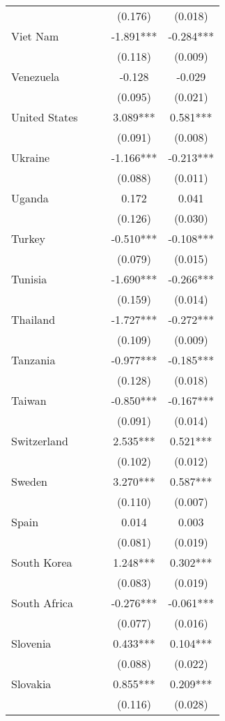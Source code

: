 \documentclass[]{article}
\begin{document}
\begin{tabular}{lcccc}
 &  &  & (0.176) & (0.018) \\
Viet Nam &  &  & -1.891*** & -0.284*** \\
 &  &  & (0.118) & (0.009) \\
Venezuela &  &  & -0.128 & -0.029 \\
 &  &  & (0.095) & (0.021) \\
United States &  &  & 3.089*** & 0.581*** \\
 &  &  & (0.091) & (0.008) \\
Ukraine &  &  & -1.166*** & -0.213*** \\
 &  &  & (0.088) & (0.011) \\
Uganda &  &  & 0.172 & 0.041 \\
 &  &  & (0.126) & (0.030) \\
Turkey &  &  & -0.510*** & -0.108*** \\
 &  &  & (0.079) & (0.015) \\
Tunisia &  &  & -1.690*** & -0.266*** \\
 &  &  & (0.159) & (0.014) \\
Thailand &  &  & -1.727*** & -0.272*** \\
 &  &  & (0.109) & (0.009) \\
Tanzania &  &  & -0.977*** & -0.185*** \\
 &  &  & (0.128) & (0.018) \\
Taiwan &  &  & -0.850*** & -0.167*** \\
 &  &  & (0.091) & (0.014) \\
Switzerland &  &  & 2.535*** & 0.521*** \\
 &  &  & (0.102) & (0.012) \\
Sweden &  &  & 3.270*** & 0.587*** \\
 &  &  & (0.110) & (0.007) \\
Spain &  &  & 0.014 & 0.003 \\
 &  &  & (0.081) & (0.019) \\
South Korea &  &  & 1.248*** & 0.302*** \\
 &  &  & (0.083) & (0.019) \\
South Africa &  &  & -0.276*** & -0.061*** \\
 &  &  & (0.077) & (0.016) \\
Slovenia &  &  & 0.433*** & 0.104*** \\
 &  &  & (0.088) & (0.022) \\
Slovakia &  &  & 0.855*** & 0.209*** \\
 &  &  & (0.116) & (0.028) \\

\end{tabular}
\end{document}
